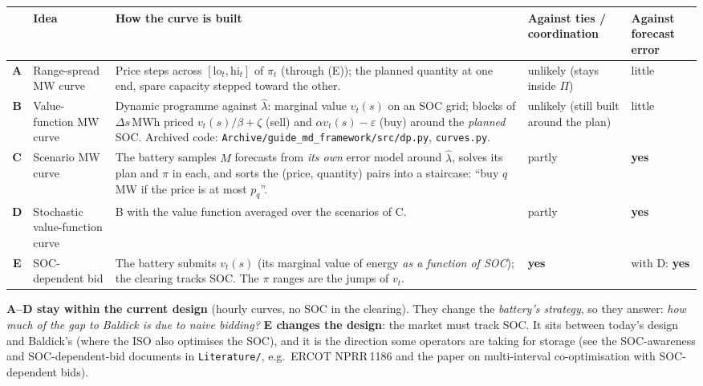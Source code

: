 \documentclass[10pt,a4paper]{article}
\newcommand{\code}[1]{\texttt{#1}}
\newcommand{\lamhat}{\hat\lambda}
\begin{document}
\begin{center}\small
\begin{tabularx}{\textwidth}{@{}c>{\raggedright\arraybackslash}p{2.9cm}>{\raggedright\arraybackslash}X>{\raggedright\arraybackslash}p{2.1cm}>{\raggedright\arraybackslash}p{2.1cm}@{}}
\toprule
 & Idea & How the curve is built & Against ties / coordination & Against forecast error \\
\midrule
\textbf{A} & Range-spread MW curve & Price steps across $[\mathrm{lo}_t,\mathrm{hi}_t]$ of $\pi_t$ (through (E)); the planned quantity at one end, spare capacity stepped toward the other. & unlikely (stays inside $\Pi$) & little \\
\textbf{B} & Value-function MW curve & Dynamic programme against $\lamhat$: marginal value $v_t(s)$ on an SOC grid; blocks of $\Delta s$\,MWh priced $v_t(s)/\beta+\zeta$ (sell) and $\alpha v_t(s)-\varepsilon$ (buy) around the \emph{planned} SOC. Archived code: \code{Archive/guide\_md\_framework/src/dp.py}, \code{curves.py}. & unlikely (still built around the plan) & little \\
\textbf{C} & Scenario MW curve & The battery samples $M$ forecasts from \emph{its own} error model around $\lamhat$, solves its plan and $\pi$ in each, and sorts the (price, quantity) pairs into a staircase: ``buy $q$\,MW if the price is at most $p_q$''. & partly & \textbf{yes} \\
\textbf{D} & Stochastic value-function curve & B with the value function averaged over the scenarios of C. & partly & \textbf{yes} \\
\textbf{E} & SOC-dependent bid & The battery submits $v_t(s)$ (its marginal value of energy \emph{as a function of SOC}); the clearing tracks SOC. The $\pi$ ranges are the jumps of $v_t$. & \textbf{yes} & with D: \textbf{yes} \\
\bottomrule
\end{tabularx}
\end{center}

\textbf{A--D stay within the current design} (hourly curves, no SOC in the clearing). They change the
\emph{battery's strategy}, so they answer: \emph{how much of the gap to Baldick is due to naive bidding?}
\textbf{E changes the design}: the market must track SOC. It sits between today's design and Baldick's (where
the ISO also optimises the SOC), and it is the direction some operators are taking for storage (see the
SOC-awareness and SOC-dependent-bid documents in \code{Literature/}, e.g.\ ERCOT NPRR\,1186 and the paper on
multi-interval co-optimisation with SOC-dependent bids).
\end{document}
